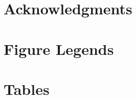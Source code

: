 \documentclass[10pt]{article}
\begin{document}
\section*{Acknowledgments}




\section*{Figure Legends}


\section*{Tables}





\end{document}
